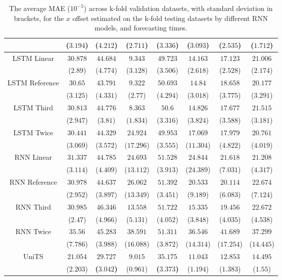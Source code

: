 \begin{table}[!ht]
{\begin{tabular}{|c|c|c|c|c|c|c|c|}
			 & ($3.194$) & ($4.212$) & ($2.711$) & ($3.336$) & ($3.093$) & ($2.535$) & ($1.712$) \\ \hline
			\multirow{2}{*}{LSTM Linear} & $30.878$ & $44.684$ & $9.343$ & $49.723$ & $14.163$ & $17.123$ & $21.006$ \\
			 & ($2.89$) & ($4.774$) & ($3.128$) & ($3.506$) & ($2.618$) & ($2.528$) & ($2.174$) \\ \hline
			\multirow{2}{*}{LSTM Reference} & $30.65$ & $43.791$ & $9.322$ & $50.693$ & $14.84$ & $18.658$ & $20.177$ \\
			 & ($3.125$) & ($4.331$) & ($2.77$) & ($4.294$) & ($3.018$) & ($3.775$) & ($3.291$) \\ \hline
			\multirow{2}{*}{LSTM Third} & $30.813$ & $44.776$ & $8.363$ & $50.6$ & $14.826$ & $17.677$ & $21.515$ \\
			 & ($2.947$) & ($3.81$) & ($1.834$) & ($3.316$) & ($3.824$) & ($3.588$) & ($3.181$) \\ \hline
			\multirow{2}{*}{LSTM Twice} & $30.441$ & $44.329$ & $24.924$ & $49.953$ & $17.069$ & $17.979$ & $20.761$ \\
			 & ($3.069$) & ($3.572$) & ($17.296$) & ($3.555$) & ($11.304$) & ($4.822$) & ($4.019$) \\ \hline
			\multirow{2}{*}{RNN Linear} & $31.337$ & $44.785$ & $24.693$ & $51.528$ & $24.844$ & $21.618$ & $21.208$ \\
			 & ($3.114$) & ($4.409$) & ($13.112$) & ($3.913$) & ($24.389$) & ($7.031$) & ($4.317$) \\ \hline
			\multirow{2}{*}{RNN Reference} & $30.978$ & $44.637$ & $26.062$ & $51.392$ & $20.533$ & $20.114$ & $22.674$ \\
			 & ($2.952$) & ($3.897$) & ($13.349$) & ($3.451$) & ($9.189$) & ($6.083$) & ($7.124$) \\ \hline
			\multirow{2}{*}{RNN Third} & $30.985$ & $46.346$ & $13.558$ & $51.722$ & $15.335$ & $19.456$ & $22.672$ \\
			 & ($2.47$) & ($4.966$) & ($5.131$) & ($4.052$) & ($3.848$) & ($4.035$) & ($4.538$) \\ \hline
			\multirow{2}{*}{RNN Twice} & $35.56$ & $45.283$ & $38.591$ & $51.311$ & $36.546$ & $41.689$ & $37.299$ \\
			 & ($7.786$) & ($3.988$) & ($16.088$) & ($3.872$) & ($14.314$) & ($17.254$) & ($14.445$) \\ \hline
			\multirow{2}{*}{UniTS} & $21.054$ & $\mathbf{29.727}$ & $9.015$ & $\mathbf{35.175}$ & $11.043$ & $12.853$ & $14.495$ \\
			 & ($2.203$) & \textbf{(}$\mathbf{3.042}$\textbf{)} & ($0.961$) & \textbf{(}$\mathbf{3.373}$\textbf{)} & ($1.194$) & ($1.383$) & ($1.55$) \\ \hline
		\end{tabular}
	}
	\caption{The average MAE ($10^{-5}$) across k-fold validation datasets, with standard deviation in brackets, for the $x$ offset estimated on the k-fold testing datasets by different RNN models, and forecasting times.}
	\label{tab:all_longitude_no_abs_MAE}
\end{table}